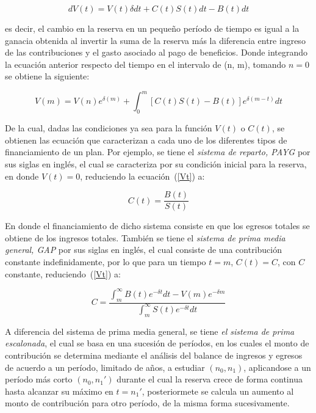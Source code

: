 \documentclass[12pt,letterpaper,titlepage]{article}
\begin{document}
\begin{equation}\label{dV}
dV(t)=V(t)\delta dt+C(t)S(t)dt-B(t)dt
\end{equation}

es decir, el cambio en la reserva en un pequeño período de tiempo es igual a la ganacia obtenida al invertir la suma de la reserva más la diferencia entre ingreso de las contribuciones y el gasto asociado al pago de beneficios. Donde integrando la ecuación anterior respecto del tiempo en el intervalo de (n, m), tomando $n=0$ se obtiene la siguiente:

\begin{equation}\label{Vt}
V(m)=V(n)e^{\delta(m)}+\int_{0}^m[C(t)S(t)-B(t)]e^{\delta(m-t)}dt
\end{equation}

De la cual, dadas las condiciones ya sea para la función $V(t)$ o $C(t)$, se obtienen las ecuación que caracterizan a cada uno de los diferentes tipos de financiamiento de un plan. Por ejemplo, se tiene el \textit{sistema de reparto, PAYG} por sus siglas en inglés, el cual se caracteriza por su condición inicial para la reserva, en donde $V(t)=0$, reduciendo la ecuación~(\ref{Vt}) a:

\begin{equation}\label{payg}
C(t)=\frac{B(t)}{S(t)}
\end{equation}

En donde el financiamiento de dicho sistema consiste en que los egresos totales se obtiene de los ingresos totales. También se tiene el \textit{sistema de prima media general, GAP} por sus siglas en inglés, el cual consiste de una contribución constante indefinidamente, por lo que para un tiempo $t=m$, $C(t)=C$, con $C$ constante, reduciendo~(\ref{Vt}) a:

\begin{equation}\label{gap}
C=\dfrac{\int_{m}^{\infty}B(t)e^{-\delta t}dt-V(m)e^{-\delta m}}{\int^{\infty}_{m}S(t)e^{-\delta t}dt}
\end{equation}

A diferencia del sistema de prima media general, se tiene \textit{el sistema de prima escalonada}, el cual se basa en una sucesión de períodos, en los cuales el monto de contribución se determina mediante el análisis del balance de ingresos y egresos de acuerdo a un período, limitado de años, a estudiar $(n_{0}, n_{1})$, aplicandose a un período más corto $(n_{0}, n_{1}')$ durante el cual la reserva crece de forma continua hasta alcanzar su máximo en $t=n_{1}'$, posteriormete se calcula un aumento al monto de contribución para otro período, de la misma forma sucesivamente.
\end{document}
